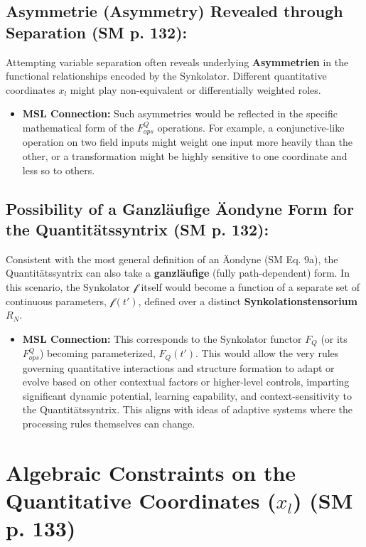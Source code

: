 \documentclass[
    12pt,              %
    a4paper,           %
    headings=normal,   %
    twoside=true,      %
    BCOR=8mm,          %
]{scrbook}
\newcommand{\funktionaloperator}{\mathcal{f}}
\begin{document}
\subsection{Asymmetrie (Asymmetry) Revealed through Separation (SM p. 132):}
\label{sec:ch8_2_3_asymmetry}
Attempting variable separation often reveals underlying \textbf{Asymmetrien} in the functional relationships encoded by the Synkolator. Different quantitative coordinates \(x_l\) might play non-equivalent or differentially weighted roles.
\begin{itemize}
    \item   \textbf{MSL Connection:} Such asymmetries would be reflected in the specific mathematical form of the \(F_{ops}^Q\) operations. For example, a conjunctive-like operation on two field inputs might weight one input more heavily than the other, or a transformation might be highly sensitive to one coordinate and less so to others.
\end{itemize}

\subsection{Possibility of a Ganzläufige Äondyne Form for the Quantitätssyntrix (SM p. 132):}
\label{sec:ch8_2_4_ganzlaeufige}
Consistent with the most general definition of an Äondyne (SM Eq. 9a), the Quantitätssyntrix can also take a \textbf{ganzläufige} (fully path-dependent) form. In this scenario, the Synkolator \(\funktionaloperator\) itself would become a function of a separate set of continuous parameters, \(\funktionaloperator(t')\), defined over a distinct \textbf{Synkolationstensorium \(R_N\)}.
\begin{itemize}
    \item   \textbf{MSL Connection:} This corresponds to the Synkolator functor \(F_Q\) (or its \(F_{ops}^Q\)) becoming parameterized, \(F_Q(t')\). This would allow the very rules governing quantitative interactions and structure formation to adapt or evolve based on other contextual factors or higher-level controls, imparting significant dynamic potential, learning capability, and context-sensitivity to the Quantitätssyntrix. This aligns with ideas of adaptive systems where the processing rules themselves can change.
\end{itemize}

\section{Algebraic Constraints on the Quantitative Coordinates (\(x_l\)) (SM p. 133)}
\label{sec:ch8_3_algebraic_constraints}
\end{document}
